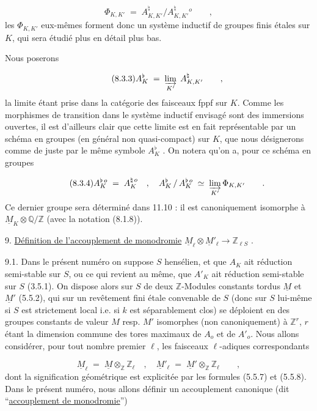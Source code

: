 \begin{equation}\tag{8.3.2}
\Phi_{K,K'} \;=\; A^{\natural}_{K,K'}/A^{\natural}_{K,K'}{}^{o} \qquad ,
\end{equation}
les $\Phi_{K,K'}$ eux-mêmes forment donc un système inductif de groupes finis étales sur $K$, qui sera étudié plus en détail plus bas.

Nous poserons

\begin{equation}\tag{8.3.3}
A^{\flat}_{K} \;=\; \varinjlim_{K'} \; A^{\natural}_{K,K'} \qquad ,
\end{equation}
la limite étant prise dans la catégorie des faisceaux fppf sur $K$. Comme les morphismes de transition dans le système inductif envisagé sont des immersions ouvertes, il est d'ailleurs clair que cette limite est en fait représentable par un schéma en groupes (en général non quasi-compact) sur $K$, que nous désignerons comme de juste par le même symbole $A^{\flat}_{K}$ . On notera qu'on a, pour ce schéma en groupes

\begin{equation}\tag{8.3.4}
A_{K}^{\flat\,o} \;=\; A_{K}^{\natural\,o} \quad , \quad A^{\flat}_{K} \,/\, A_{K}^{\flat\,o} \;\simeq\; \varinjlim_{K'} \Phi_{K,K'} \qquad .
\end{equation}
Ce dernier groupe sera déterminé dans 11.10 : il est canoniquement isomorphe à $\underline{M}_{K}\otimes\mathbb{Q}/\mathbb{Z}$ (avec la notation (8.1.8)).




9. \underline{Définition de l'accouplement de monodromie} $\underline{M}_{\ell}\otimes\underline{M}'_{\ell} \longrightarrow \mathbb{Z}_{\ell S}$ .

9.1. Dans le présent numéro on suppose $S$ hensélien, et que $A_{K}$ ait réduction semi-stable sur $S$, ou ce qui revient au même, que $A'_{K}$ ait réduction semi-stable sur $S$ (3.5.1). On dispose alors sur $S$ de deux $\mathbb{Z}$-Modules constants tordus $\underline{M}$ et $\underline{M}'$ (5.5.2), qui sur un revêtement fini étale convenable de $S$ (donc sur $S$ lui-même si $S$ est strictement local i.e. si $k$ est séparablement clos) se déploient en des groupes constants de valeur $M$ resp. $M'$ isomorphes (non canoniquement) à $\mathbb{Z}^{r}$, $r$ étant la dimension commune des tores maximaux de $A_{o}$ et de $A'_{o}$. Nous allons considérer, pour tout nombre premier $\ell$, les faisceaux $\ell$-adiques correspondants

\begin{equation}\tag{9.1.1}
\underline{M}_{\ell} \;=\; \underline{M}\otimes_{\mathbb{Z}}\mathbb{Z}_{\ell} \quad , \quad \underline{M}'_{\ell} \;=\; \underline{M}'\otimes_{\mathbb{Z}}\mathbb{Z}_{\ell} \qquad ,
\end{equation}
dont la signification géométrique est explicitée par les formules (5.5.7) et (5.5.8). Dans le présent numéro, nous allons définir un accouplement canonique (dit ``\underline{accouplement de monodromie}'')

